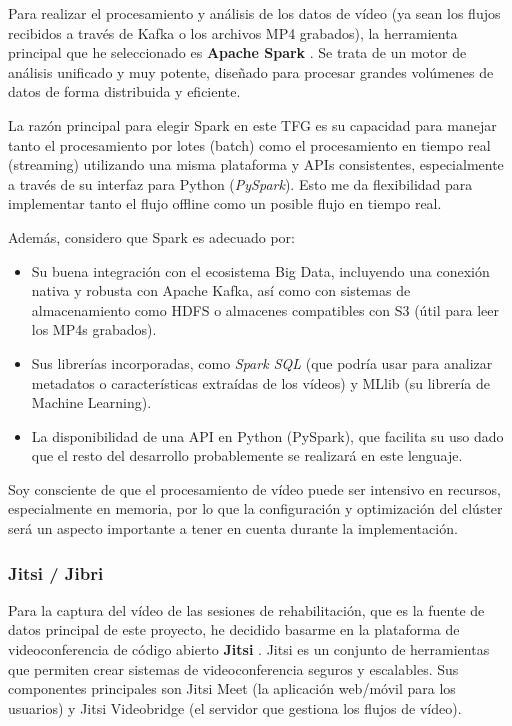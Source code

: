 Para realizar el procesamiento y análisis de los datos de vídeo (ya sean los flujos recibidos a través de Kafka o los archivos MP4 grabados), la herramienta principal que he seleccionado es \textbf{Apache Spark} \cite{SparkWebDoc}. Se trata de un motor de análisis unificado y muy potente, diseñado para procesar grandes volúmenes de datos de forma distribuida y eficiente.

La razón principal para elegir Spark en este TFG es su capacidad para manejar tanto el procesamiento por lotes (batch) como el procesamiento en tiempo real (streaming) utilizando una misma plataforma y APIs consistentes, especialmente a través de su interfaz para Python (\textit{PySpark}). Esto me da flexibilidad para implementar tanto el flujo offline como un posible flujo en tiempo real.

Además, considero que Spark es adecuado por:
\begin{itemize}
    \item Su buena integración con el ecosistema Big Data, incluyendo una conexión nativa y robusta con Apache Kafka, así como con sistemas de almacenamiento como HDFS o almacenes compatibles con S3 (útil para leer los MP4s grabados).
    \item Sus librerías incorporadas, como \textit{Spark SQL} (que podría usar para analizar metadatos o características extraídas de los vídeos) y MLlib (su librería de Machine Learning).
    \item La disponibilidad de una API en Python (PySpark), que facilita su uso dado que el resto del desarrollo probablemente se realizará en este lenguaje.
\end{itemize}

Soy consciente de que el procesamiento de vídeo puede ser intensivo en recursos, especialmente en memoria, por lo que la configuración y optimización del clúster será un aspecto importante a tener en cuenta durante la implementación.

\subsubsection{Jitsi / Jibri}


Para la captura del vídeo de las sesiones de rehabilitación, que es la fuente de datos principal de este proyecto, he decidido basarme en la plataforma de videoconferencia de código abierto \textbf{Jitsi} \cite{JitsiJibriDocs}. Jitsi es un conjunto de herramientas que permiten crear sistemas de videoconferencia seguros y escalables. Sus componentes principales son Jitsi Meet (la aplicación web/móvil para los usuarios) y Jitsi Videobridge (el servidor que gestiona los flujos de vídeo).

